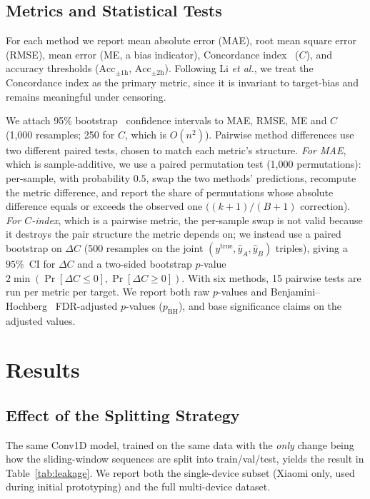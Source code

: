 \documentclass[conference]{IEEEtran}
\begin{document}
\subsection{Metrics and Statistical Tests}
\label{sec:metrics}
For each method we report mean absolute error (MAE), root mean square
error (RMSE), mean error (ME, a bias indicator), Concordance
index~\cite{harrell1982evaluating} ($C$), and accuracy thresholds
($\text{Acc}_{\pm 1\text{h}}$, $\text{Acc}_{\pm 2\text{h}}$).
Following Li \emph{et al.}\cite{li2018predicting}, we treat the
Concordance index as the primary metric, since it is invariant to
target-bias and remains meaningful under censoring.

We attach 95\% bootstrap~\cite{efron1979bootstrap} confidence intervals to MAE, RMSE, ME and $C$
(1{,}000 resamples; 250 for $C$, which is $O(n^2)$). Pairwise method
differences use two different paired tests, chosen to match each
metric's structure. \emph{For MAE}, which is sample-additive, we use a
paired permutation test (1{,}000 permutations): per-sample, with
probability $0.5$, swap the two methods' predictions, recompute the
metric difference, and report the share of permutations whose absolute
difference equals or exceeds the observed one
$((k{+}1)/(B{+}1)$ correction). \emph{For $C$-index}, which is a
pairwise metric, the per-sample swap is not valid because it destroys
the pair structure the metric depends on; we instead use a paired
bootstrap on $\Delta C$ (500 resamples on the joint
$(y^{\text{true}}, \hat y_A, \hat y_B)$ triples), giving a $95\%$~CI
for $\Delta C$ and a two-sided bootstrap $p$-value
$2\min(\Pr[\Delta C \le 0], \Pr[\Delta C \ge 0])$.
With six methods, 15 pairwise tests are run per metric per target.
We report both raw $p$-values and
Benjamini--Hochberg~\cite{benjamini1995controlling} FDR-adjusted
$p$-values ($p_{\text{BH}}$), and base significance claims on the
adjusted values.

\section{Results}
\label{sec:results}

\subsection{Effect of the Splitting Strategy}
\label{sec:results-leakage}
The same Conv1D model, trained on the same data with the \emph{only}
change being how the sliding-window sequences are split into
train/val/test, yields the result in Table~\ref{tab:leakage}. We
report both the single-device subset (Xiaomi only, used during initial
prototyping) and the full multi-device dataset.
\end{document}
